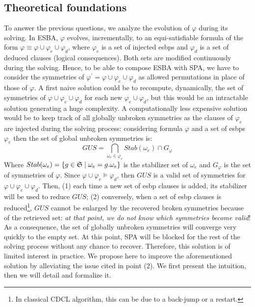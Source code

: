 \subsection{Theoretical foundations}
\label{sec:tf}
To answer the previous questions, we analyze the evolution of $\varphi$ during
its solving. In ESBA, $\varphi$ evolves, incrementally, to an
equi-satisfiable formula of the form $\varphi \equiv \varphi \cup \varphi_e
\cup \varphi_d$, where $\varphi_e$ is a set of injected esbps and $\varphi_d$
is a set of deduced clauses (logical consequences). Both sets are modified continuously during the solving. Hence, to be able to compose ESBA with SPA, we have to consider the symmetries of $\varphi^\prime=\varphi \cup \varphi_e \cup \varphi_d$ as
allowed permutations in place of those of $\varphi$.
A first naive solution could be to recompute, dynamically, the set of symmetries of $\varphi
\cup \varphi_e \cup \varphi_d$ for each new $\varphi_e \cup \varphi_d$, but
this would be an intractable solution generating a huge complexity. 
A  computationally less expensive solution would be to keep track of all globally unbroken symmetries as the clauses of $\varphi_e$ are injected during the solving process: considering formula $\varphi$ and 
a set of esbps $\varphi_e$ then the set of global unbroken symmetries is:
$$GUS = \underset{\omega_e \in \varphi_e}{\bigcap}Stab(\omega_e) \cap G_{\varphi}$$
 Where  $Stab(\omega_e)=\{g \in \mathfrak{S} \mid
\omega_e=g.\omega_e\}$ is the stabilizer set of $\omega_e$ and $G_{\varphi}$ is the set of symmetries of $\varphi$. 
Since $\varphi \cup \varphi_e  \models \varphi_d$, then $GUS$ is a valid set of symmetries for $\varphi \cup \varphi_e \cup \varphi_d$.
Then, (1) each time a new set of esbp clauses is added, its stabilizer will be used to reduce $GUS$;\label{prop:one}
(2) conversely, when a set of esbp clauses is reduced\footnote{In classical CDCL algorithm, this can be due to a back-jump or a restart.},
$GUS$ cannot be enlarged by the recovered broken symmetries because of the retrieved set:
\textit{at that point, we do not know which symmetries become valid}! 
As a consequence, the set of globally unbroken symmetries will converge very quickly to the empty set. 
At this point, SPA will be blocked for the rest of the solving process without any chance to recover.
 Therefore, this solution is of limited interest in practice.
We propose here to improve the aforementioned solution by alleviating the issue cited in point (2).
We first present the intuition, then we will detail and formalize it. 
